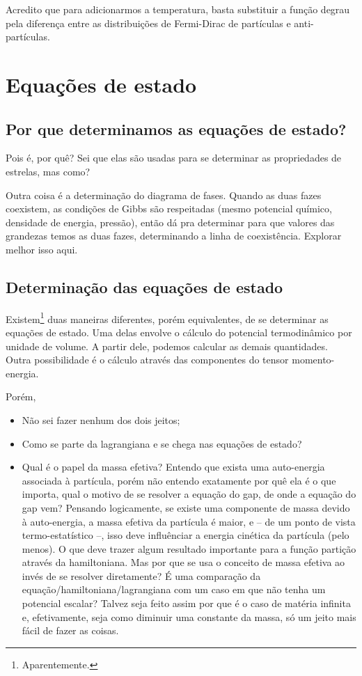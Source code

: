 Acredito que para adicionarmos a temperatura, basta substituir a função degrau pela diferença entre as distribuições de Fermi-Dirac de partículas e anti-partículas.

\section{Equações de estado}

\subsection{Por que determinamos as equações de estado?}

Pois é, por quê? Sei que elas são usadas para se determinar as propriedades de estrelas, mas como?

Outra coisa é a determinação do diagrama de fases. Quando as duas fazes coexistem, as condições de Gibbs são respeitadas (mesmo potencial químico, densidade de energia, pressão), então dá pra determinar para que valores das grandezas temos as duas fazes, determinando a linha de coexistência. Explorar melhor isso aqui.

\subsection{Determinação das equações de estado}

Existem\footnote{Aparentemente.} duas maneiras diferentes, porém equivalentes, de se determinar as equações de estado. Uma delas envolve o cálculo do potencial termodinâmico por unidade de volume. A partir dele, podemos calcular as demais quantidades. Outra possibilidade é o cálculo através das componentes do tensor momento-energia.

Porém,
\begin{itemize}
	\item Não sei fazer nenhum dos dois jeitos;
	\item Como se parte da lagrangiana e se chega nas equações de estado?
	\item Qual é o papel da massa efetiva? Entendo que exista uma auto-energia associada à partícula, porém não entendo exatamente por quê ela é o que importa, qual o motivo de se resolver a equação do gap, de onde a equação do gap vem? Pensando logicamente, se existe uma componente de massa devido à auto-energia, a massa efetiva da partícula é maior, e -- de um ponto de vista termo-estatístico --, isso deve influênciar a energia cinética da partícula (pelo menos). O que deve trazer algum resultado importante para a função partição através da hamiltoniana. Mas por que se usa o conceito de massa efetiva ao invés de se resolver diretamente? É uma comparação da equação/hamiltoniana/lagrangiana com um caso em que não tenha um potencial escalar? Talvez seja feito assim por que é o caso de matéria infinita e, efetivamente, seja como diminuir uma constante da massa, só um jeito mais fácil de fazer as coisas.
\end{itemize}

